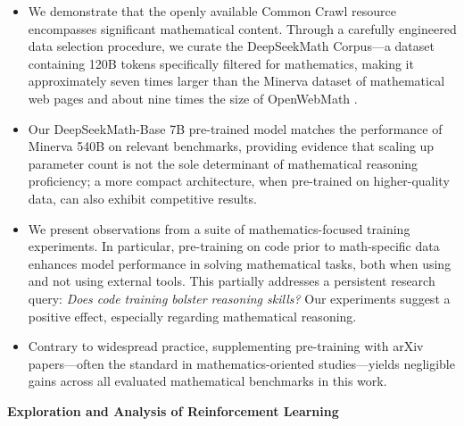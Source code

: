 \begin{itemize}[topsep=0pt]
    \item We demonstrate that the openly available Common Crawl resource encompasses significant mathematical content. Through a carefully engineered data selection procedure, we curate the DeepSeekMath Corpus—a dataset containing 120B tokens specifically filtered for mathematics, making it approximately seven times larger than the Minerva \citep{minerva} dataset of mathematical web pages and about nine times the size of OpenWebMath \citep{openwebmath}.

    \item Our DeepSeekMath-Base 7B pre-trained model matches the performance of Minerva 540B \citep{minerva} on relevant benchmarks, providing evidence that scaling up parameter count is not the sole determinant of mathematical reasoning proficiency; a more compact architecture, when pre-trained on higher-quality data, can also exhibit competitive results.

    \item We present observations from a suite of mathematics-focused training experiments. In particular, pre-training on code prior to math-specific data enhances model performance in solving mathematical tasks, both when using and not using external tools. This partially addresses a persistent research query: \textit{Does code training bolster reasoning skills?} Our experiments suggest a positive effect, especially regarding mathematical reasoning.

    \item Contrary to widespread practice, supplementing pre-training with arXiv papers—often the standard in mathematics-oriented studies—yields negligible gains across all evaluated mathematical benchmarks in this work.
\end{itemize}

\textbf{Exploration and Analysis of Reinforcement Learning}

